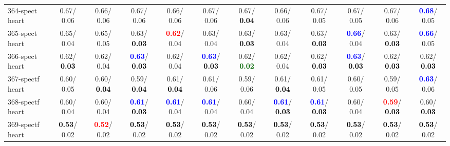 \begin{table}[h]
\begin{center}
{\begin{tabular}{lc|c|c|c|c|c|c|c|c|c|c}
364-spect heart &   0.67/  0.06 &   0.66/  0.06 &   0.67/  0.06 &   0.66/  0.06 &   0.67/  0.06 &   0.67/\textcolor{black}{\textbf{  0.04}} &   0.66/  0.06 &   0.67/  0.05 &   0.67/  0.05 &   0.67/  0.06 & \textcolor{blue}{\textbf{  0.68}}/  0.05 \\
365-spect heart &   0.65/  0.04 &   0.65/  0.05 &   0.63/\textcolor{black}{\textbf{  0.03}} & \textcolor{red}{\textbf{  0.62}}/  0.04 &   0.63/  0.04 &   0.63/\textcolor{black}{\textbf{  0.03}} &   0.63/  0.04 &   0.63/\textcolor{black}{\textbf{  0.03}} & \textcolor{blue}{\textbf{  0.66}}/  0.04 &   0.63/\textcolor{black}{\textbf{  0.03}} & \textcolor{blue}{\textbf{  0.66}}/  0.05 \\
366-spect heart &   0.62/\textcolor{black}{\textbf{  0.03}} &   0.62/  0.04 & \textcolor{blue}{\textbf{  0.63}}/\textcolor{black}{\textbf{  0.03}} &   0.62/  0.04 & \textcolor{blue}{\textbf{  0.63}}/\textcolor{black}{\textbf{  0.03}} &   0.62/\textcolor{darkgreen}{\textbf{  0.02}} &   0.62/  0.04 &   0.62/\textcolor{black}{\textbf{  0.03}} & \textcolor{blue}{\textbf{  0.63}}/\textcolor{black}{\textbf{  0.03}} &   0.62/\textcolor{black}{\textbf{  0.03}} &   0.62/\textcolor{black}{\textbf{  0.03}} \\ \hline
367-spectf heart &   0.60/  0.05 &   0.60/\textcolor{black}{\textbf{  0.04}} &   0.59/\textcolor{black}{\textbf{  0.04}} &   0.61/\textcolor{black}{\textbf{  0.04}} &   0.61/  0.06 &   0.59/  0.06 &   0.61/\textcolor{black}{\textbf{  0.04}} &   0.61/  0.05 &   0.60/  0.05 &   0.59/  0.05 & \textcolor{blue}{\textbf{  0.63}}/  0.06 \\
368-spectf heart &   0.60/  0.04 &   0.60/  0.04 & \textcolor{blue}{\textbf{  0.61}}/\textcolor{black}{\textbf{  0.03}} & \textcolor{blue}{\textbf{  0.61}}/  0.04 & \textcolor{blue}{\textbf{  0.61}}/  0.04 &   0.60/  0.04 & \textcolor{blue}{\textbf{  0.61}}/\textcolor{black}{\textbf{  0.03}} & \textcolor{blue}{\textbf{  0.61}}/\textcolor{black}{\textbf{  0.03}} &   0.60/  0.04 & \textcolor{red}{\textbf{  0.59}}/\textcolor{black}{\textbf{  0.03}} &   0.60/\textcolor{black}{\textbf{  0.03}} \\
369-spectf heart & \textcolor{black}{\textbf{  0.53}}/  0.02 & \textcolor{red}{\textbf{  0.52}}/  0.02 & \textcolor{black}{\textbf{  0.53}}/  0.02 & \textcolor{black}{\textbf{  0.53}}/  0.02 & \textcolor{black}{\textbf{  0.53}}/  0.02 & \textcolor{black}{\textbf{  0.53}}/  0.02 & \textcolor{black}{\textbf{  0.53}}/  0.02 & \textcolor{black}{\textbf{  0.53}}/  0.02 & \textcolor{black}{\textbf{  0.53}}/  0.02 & \textcolor{black}{\textbf{  0.53}}/  0.02 & \textcolor{black}{\textbf{  0.53}}/  0.02 \\

\end{tabular}}
\end{center}
\end{table}
